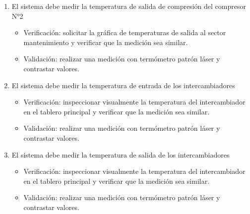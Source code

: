 \documentclass[
11pt, %
]{charter}
\begin{document}
\begin{enumerate}
\begin{enumerate}
\begin{itemize}
			\end{itemize}
			\item El sistema debe medir la temperatura de salida de compresión del compresor N°2
			\begin{itemize}
				\item Verificación: solicitar la gráfica de temperaturas de salida al sector mantenimiento y verificar que la medición sea similar.
				\item Validación: realizar una medición con termómetro patrón láser y contrastar valores.
			\end{itemize}
			\item El sistema debe medir la temperatura de entrada de los intercambiadores
			\begin{itemize}
				\item Verificación: inspeccionar visualmente la temperatura del intercambiador en el tablero principal y verificar que la medición sea similar.
				\item Validación: realizar una medición con termómetro patrón láser y contrastar valores.
			\end{itemize}
			\item El sistema debe medir la temperatura de salida de los intercambiadores
			\begin{itemize}
				\item Verificación: inspeccionar visualmente la temperatura del intercambiador en el tablero principal y verificar que la medición sea similar.
				\item Validación: realizar una medición con termómetro patrón láser y contrastar valores.
			\end{itemize}

\pagebreak


\end{enumerate}
\end{enumerate}
\end{document}
